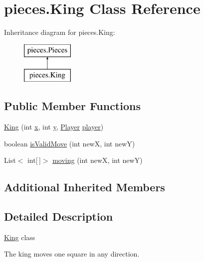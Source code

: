 \hypertarget{classpieces_1_1_king}{}\section{pieces.\+King Class Reference}
\label{classpieces_1_1_king}
Inheritance diagram for pieces.\+King\+:\begin{figure}[H]
\begin{center}
\leavevmode
\includegraphics[height=2.000000cm]{classpieces_1_1_king}
\end{center}
\end{figure}
\subsection*{Public Member Functions}
\begin{DoxyCompactItemize}
\item 
\mbox{\hyperlink{classpieces_1_1_king_aeb8f844df907887869024c67508ab8f0}{King}} (int \mbox{\hyperlink{classpieces_1_1_pieces_ac5178f9b8a6b0c4235851475081249f3}{x}}, int \mbox{\hyperlink{classpieces_1_1_pieces_a66d911734967a8ced1b9792fe900fadb}{y}}, \mbox{\hyperlink{classgame_1_1_player}{Player}} \mbox{\hyperlink{classpieces_1_1_pieces_a49f35044dd36e5c4b04261a8ea54ad0c}{player}})
\item 
boolean \mbox{\hyperlink{classpieces_1_1_king_a308ed50d558d0c681242c8dcd76cd37e}{is\+Valid\+Move}} (int newX, int newY)
\item 
List$<$ int\mbox{[}$\,$\mbox{]}$>$ \mbox{\hyperlink{classpieces_1_1_king_a8cadd535c0a47713806bb65c975f2233}{moving}} (int newX, int newY)
\end{DoxyCompactItemize}
\subsection*{Additional Inherited Members}


\subsection{Detailed Description}
\mbox{\hyperlink{classpieces_1_1_king}{King}} class 

The king moves one square in any direction. 


